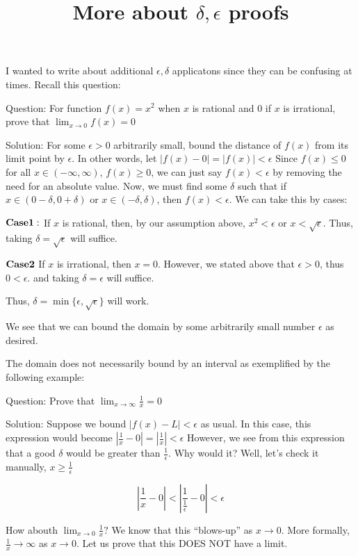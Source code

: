 \documentclass[12pt]{article}
\title{More about $\delta,\epsilon$ proofs}
\theoremstyle{remark}
\begin{document}
\maketitle




I wanted to write about additional $\epsilon,\delta$ applicatons since they can be confusing at times. Recall this question:

Question: For function $f(x) = x^2$ when $x$ is rational and 0 if $x$ is irrational, prove that $\lim_{x \rightarrow 0}f(x) = 0$

Solution: For some $\epsilon > 0$ arbitrarily small, bound the distance of $f(x)$ from its limit point by $\epsilon$. In other words, let $|f(x) - 0| = |f(x)| < \epsilon$ Since $f(x) \leq 0$ for all $x \in (-\infty,\infty)$, $f(x) \geq 0 $, we can just say $f(x) < \epsilon$ by removing the need for an absolute value. Now, we must find some $\delta$ such that if $x \in (0-\delta,0+\delta)$ or $x \in (-\delta,\delta)$, then $f(x) < \epsilon$. We can take this by cases: \par
${\bf Case 1:}$ If $x$ is rational, then, by our assumption above, $x^2 < \epsilon$ or $x < \sqrt{\epsilon}$. Thus, taking $\delta = \sqrt{\epsilon}$ will suffice. \par
${\bf Case 2}$ If $x$ is irrational, then $x = 0$. However, we stated above that $\epsilon > 0 $, thus $ 0 <\epsilon$. and taking $\delta = \epsilon$ will suffice. \par
Thus, $\delta = \min\{\epsilon,\sqrt{\epsilon}\}$ will work.


We see that we can bound the domain by some arbitrarily small number $\epsilon$ as desired.
\newpage

The domain does not necessarily bound by an interval as exemplified by the following example:

Question: Prove that $\lim_{x \rightarrow \infty} \frac{1}{x} = 0$ \par

Solution: Suppose we bound $|f(x) - L| < \epsilon$ as usual. In this case, this expression would become $|\frac{1}{x} -0| = |\frac{1}{x}|  < \epsilon$
However, we see from this expression that a good $\delta$ would be greater than $\frac{1}{\epsilon}$. Why would it? Well, let's check it manually, $x \geq \frac{1}{\epsilon}$

 $$|\frac{1}{x} - 0| < |\frac{1}{\frac{1}{\epsilon}} - 0| < \epsilon$$
  
 How abouth $\lim_{x \rightarrow 0} \frac{1}{x}?$ We know that this ``blows-up'' as $x \rightarrow 0$. More formally, $\frac{1}{x}\rightarrow \infty$ as $x \rightarrow 0$. Let us prove that this DOES NOT have a limit.
 
\end{document}

